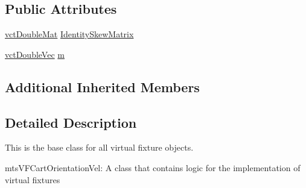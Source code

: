 \subsection*{Public Attributes}
\begin{DoxyCompactItemize}
\item 
\hyperlink{vct_dynamic_matrix_types_8h_a48f1eb2461d20a99e824ee5753a37c84}{vct\-Double\-Mat} \hyperlink{classmts_v_f_cartesian_orientation_a591d914dd2e7eb01503dc01823ed0c73}{Identity\-Skew\-Matrix}
\item 
\hyperlink{vct_dynamic_vector_types_8h_ade4b3068c86fb88f41af2e5187e491c2}{vct\-Double\-Vec} \hyperlink{classmts_v_f_cartesian_orientation_a9734c48a17ee90633f1114ad980560c2}{m}
\end{DoxyCompactItemize}
\subsection*{Additional Inherited Members}


\subsection{Detailed Description}
This is the base class for all virtual fixture objects. 

mts\-V\-F\-Cart\-Orientation\-Vel\-: A class that contains logic for the implementation of virtual fixtures 

